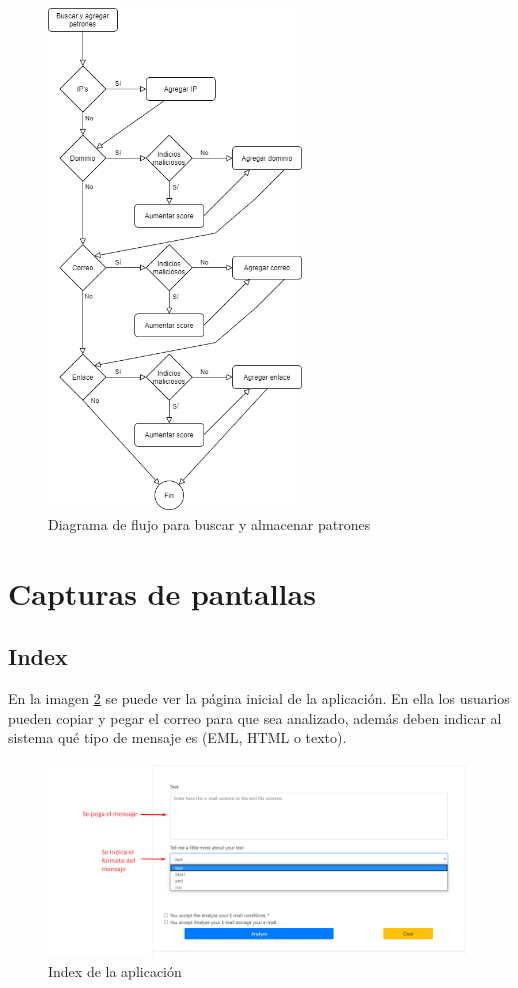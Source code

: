 \begin{figure}[htb]
    \centering
    \includegraphics[width=0.6\textwidth]{imagenes/DiagramasFlujo/Buscar_agregar_patrones.png}
\caption{Diagrama de flujo para buscar y almacenar patrones}
\label{fig:patrones}
\end{figure}
\clearpage
\section{Capturas de pantallas}
\subsection{Index}
En la imagen \ref{fig:index} se puede ver la página inicial de la aplicación. 
En ella los usuarios pueden copiar y pegar el correo para que sea analizado, además deben indicar al sistema qué tipo de mensaje es (EML, HTML o texto).
\begin{figure}[htb]
    \centering
    \includegraphics[width=\textwidth]{imagenes/capturasAplicacion/Analizar_mensaje.png}
\caption{Index de la aplicación}
\label{fig:index}
\end{figure}

